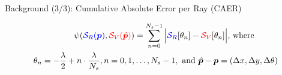 \begin{frame}[noframenumbering]{Background (3/3): Cumulative Absolute Error per Ray (CAER)}

  \begin{overlayarea}{\textwidth}{\textheight}

    \begin{align}
      \psi(\textcolor{blue}{\mathcal{S}_R(\bm{p})}, \textcolor{red}{\mathcal{S}_V(\hat{\bm{p}})}) &= \sum\limits_{n=0}^{N_s-1}\Big|\textcolor{blue}{\mathcal{S}_R}[\theta_n] - \textcolor{red}{\mathcal{S}_V}[\theta_n] \Big| \text{, where} \nonumber \\
      \theta_n = -\dfrac{\lambda}{2} + n \cdot \dfrac{\lambda}{N_s}, n = 0,1,&\dots,N_s-1, \text{ and } \hat{\bm{p}}-\bm{p} = (\Delta x, \Delta y, \Delta \theta )\nonumber
    \end{align}

    \vspace{-0.5cm}

    \begin{figure}
      
    \end{figure}

  \end{overlayarea}



\end{frame}
